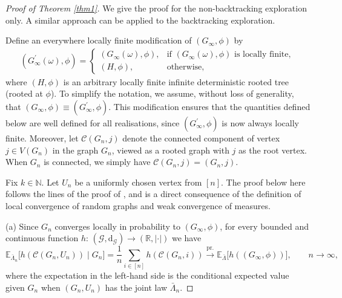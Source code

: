 \documentclass[11pt]{article}
\numberwithin{equation}{section}
\theoremstyle{plain}
\newcommand{\N}{\mathbb N}
\newcommand{\R}{\mathbb R}
\newcommand{\prob}{\overset{\mathrm{pr.}}{\longrightarrow}}
\newcommand{\E}{\mathbb E}
\begin{document}
\begin{proof}[Proof of Theorem \ref{thm1}]
We give the proof for the non-backtracking exploration only. A similar approach can be applied to the backtracking exploration.

Define an everywhere locally finite modification of $(G_{\infty},\phi)$ by
\begin{align}
\label{Ginfinity}
(G_{\infty}^{\prime}(\omega),\phi) = 
\left\{
\begin{array}{ll}
(G_{\infty}(\omega),\phi), &\text{if }(G_{\infty}(\omega),\phi) \text{ is locally finite}, \\
(H,\phi), &\text{otherwise},
\end{array} \right.
\end{align}
where $(H,\phi)$ is an arbitrary locally finite infinite deterministic rooted tree (rooted at $\phi$). To simplify the notation, we assume, without loss of generality, that $(G_{\infty}, \phi) \equiv (G_{\infty}^{\prime}, \phi)$. This modification ensures that the quantities defined below are well defined for all realisations, since $(G_\infty^\prime,\phi)$ is now always locally finite. Moreover, let $\mathscr{C}(G_n, j)$ denote the connected component of vertex $j \in V(G_n)$ in the graph $G_n$, viewed as a rooted graph with $j$ as the root vertex. When $G_n$ is connected, we simply have $\mathscr{C}(G_{n},j)=(G_{n},j)$. 

Fix $k\in\N$. Let $U_{n}$ be a uniformly chosen vertex from $[n]$. The proof below here follows the lines of the proof of \cite[Theorems 2.3--2.4]{HHP}, and is a direct consequence of the definition of local convergence of random graphs and weak convergence of measures.

\medskip\noindent
(a) Since $G_{n}$ converges locally in probability to $(G_{\infty},\phi)$, for every bounded and continuous function $h\colon\,(\mathscr{G},\mathrm{d}_{\mathscr{G}}) \to (\R,\vert\cdot\vert)$ we have 
\begin{equation}
\label{a-1}
\E_{\bar{\Lambda}_{n}}\big[h(\mathscr{C}(G_{n},U_{n})) \mid G_{n}\big] 
= \dfrac{1}{n} \sum_{i \in [n]} h(\mathscr{C}(G_{n},i)) \prob \E_{\bar{\Lambda}}\big[h((G_{\infty},\phi))\big],
\qquad n\to\infty,
\end{equation}
where the expectation in the left-hand side is the conditional expected value given $G_{n}$ when $(G_{n},U_{n})$ has the joint law $\bar{\Lambda}_{n}$. 


\end{proof}
\end{document}
